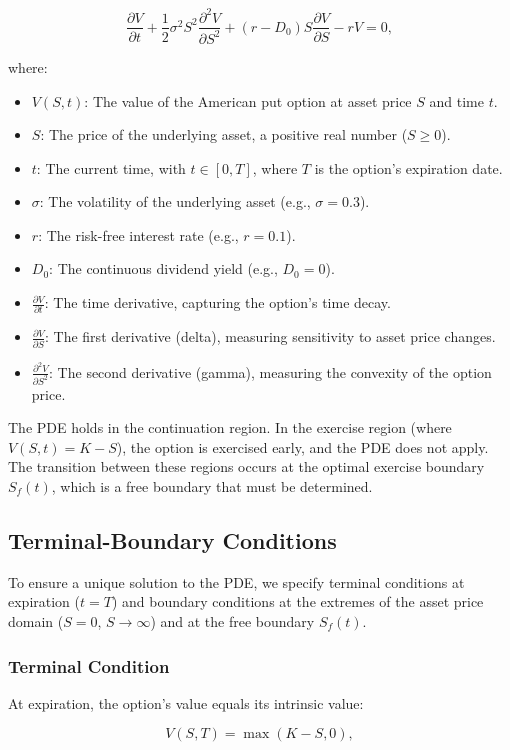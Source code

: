 \documentclass[12pt]{article}
\begin{document}
\begin{equation}
\frac{\partial V}{\partial t} + \frac{1}{2} \sigma^2 S^2 \frac{\partial^2 V}{\partial S^2} + (r - D_0) S \frac{\partial V}{\partial S} - r V = 0,
\end{equation}

where:
\begin{itemize}
    \item \( V(S, t) \): The value of the American put option at asset price \( S \) and time \( t \).
    \item \( S \): The price of the underlying asset, a positive real number (\( S \geq 0 \)).
    \item \( t \): The current time, with \( t \in [0, T] \), where \( T \) is the option's expiration date.
    \item \( \sigma \): The volatility of the underlying asset (e.g., \( \sigma = 0.3 \)).
    \item \( r \): The risk-free interest rate (e.g., \( r = 0.1 \)).
    \item \( D_0 \): The continuous dividend yield (e.g., \( D_0 = 0 \)).
    \item \( \frac{\partial V}{\partial t} \): The time derivative, capturing the option's time decay.
    \item \( \frac{\partial V}{\partial S} \): The first derivative (delta), measuring sensitivity to asset price changes.
    \item \( \frac{\partial^2 V}{\partial S^2} \): The second derivative (gamma), measuring the convexity of the option price.
\end{itemize}

The PDE holds in the continuation region. In the exercise region (where \( V(S, t) = K - S \)), the option is exercised early, and the PDE does not apply. The transition between these regions occurs at the optimal exercise boundary \( S_f(t) \), which is a free boundary that must be determined.

\subsection{Terminal-Boundary Conditions}
To ensure a unique solution to the PDE, we specify terminal conditions at expiration (\( t = T \)) and boundary conditions at the extremes of the asset price domain (\( S = 0 \), \( S \to \infty \)) and at the free boundary \( S_f(t) \).

\subsubsection{Terminal Condition}
At expiration, the option's value equals its intrinsic value:

\begin{equation}
V(S, T) = \max(K - S, 0),
\end{equation}
\end{document}
